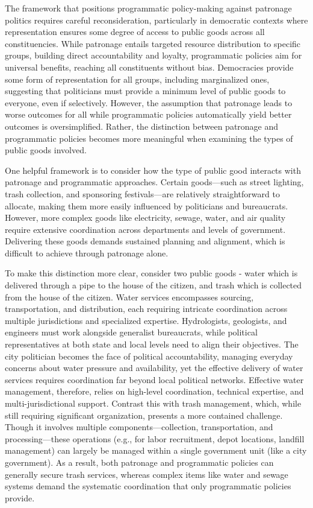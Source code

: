 The framework that positions programmatic policy-making against patronage politics requires careful reconsideration, particularly in democratic contexts where representation ensures some degree of access to public goods across all constituencies. While patronage entails targeted resource distribution to specific groups, building direct accountability and loyalty, programmatic policies aim for universal benefits, reaching all constituents without bias. Democracies provide some form of representation for all groups, including marginalized ones, suggesting that politicians must provide a minimum level of public goods to everyone, even if selectively. However, the assumption that patronage leads to worse outcomes for all while programmatic policies automatically yield better outcomes is oversimplified. Rather, the distinction between patronage and programmatic policies becomes more meaningful when examining the types of public goods involved.

One helpful framework is to consider how the type of public good interacts with patronage and programmatic approaches. Certain goods—such as street lighting, trash collection, and sponsoring festivals—are relatively straightforward to allocate, making them more easily influenced by politicians and bureaucrats. However, more complex goods like electricity, sewage, water, and air quality require extensive coordination across departments and levels of government. Delivering these goods demands sustained planning and alignment, which is difficult to achieve through patronage alone.

To make this distinction more clear, consider two public goods - water which is delivered through a pipe to the house of the citizen, and trash which is collected from the house of the citizen. Water services encompasses sourcing, transportation, and distribution, each requiring intricate coordination across multiple jurisdictions and specialized expertise. Hydrologists, geologists, and engineers must work alongside generalist bureaucrats, while political representatives at both state and local levels need to align their objectives. The city politician becomes the face of political accountability, managing everyday concerns about water pressure and availability, yet the effective delivery of water services requires coordination far beyond local political networks. Effective water management, therefore, relies on high-level coordination, technical expertise, and multi-jurisdictional support. Contrast this with trash management, which, while still requiring significant organization, presents a more contained challenge. Though it involves multiple components—collection, transportation, and processing—these operations (e.g., for labor recruitment, depot locations, landfill management) can largely be managed within a single government unit (like a city government). As a result, both patronage and programmatic policies can generally secure trash services, whereas complex items like water and sewage systems demand the systematic coordination that only programmatic policies provide.

